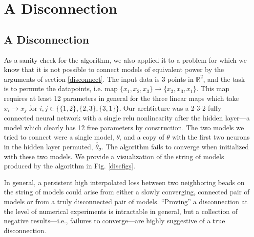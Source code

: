  


\section{A Disconnection}
\label{sec:disconnect}

\subsection{A Disconnection}
\label{symdisc}

 As a sanity check for the algorithm, we also applied it to a problem for which we know that it is not possible to connect models of equivalent power by the arguments of section \ref{disconnect}.  The input data is 3 points in $\mathbb{R}^2$, and the task is to permute the datapoints, i.e. map $\{x_1,x_2,x_3\} \to \{x_2,x_3,x_1\}$.  This map requires at least 12 parameters in general for the three linear maps which take $x_i\to x_j$ for $i,j \in \{\{1,2\},\{2,3\},\{3,1\}\}$.  Our archticture was a 2-3-2 fully connected neural network with a single relu nonlinearity after the hidden layer---a model which clearly has 12 free parameters by construction.  The two models we tried to connect were a single model, $\theta$, and a copy of $\theta$ with the first two neurons in the hidden layer permuted, $\tilde{\theta_{\sigma}}$.  The algorithm fails to converge when initialized with these two models.  We provide a visualization of the string of models produced by the algorithm in Fig. \ref{discfigs}.
 
 In general, a persistent high interpolated loss between two neighboring beads on the string of models could arise from either a slowly converging, connected pair of models or from a truly disconnected pair of models.  ``Proving'' a disconnection at the level of numerical experiments is intractable in general, but a collection of negative results---i.e., failures to converge---are highly suggestive of a true disconnection.
 
